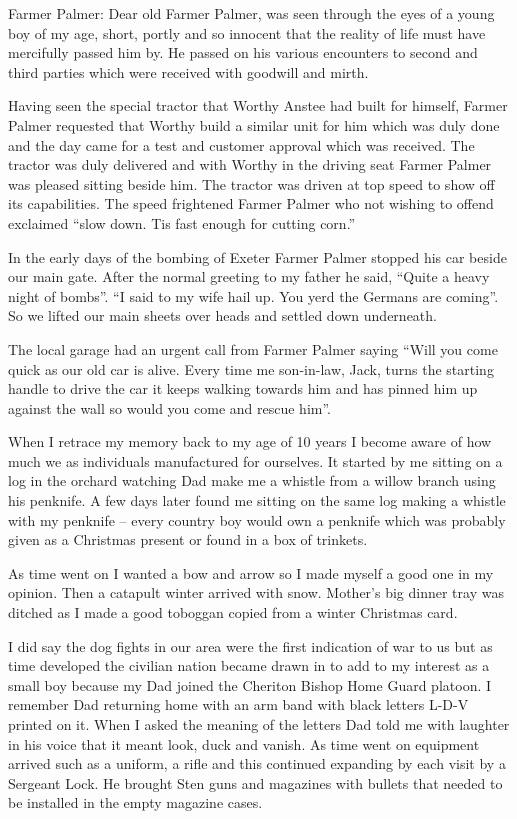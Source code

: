 
Farmer Palmer:  Dear old Farmer Palmer, was seen through the eyes of a young boy
of my age, short,  portly and so innocent that the reality of life must have
mercifully passed him by.  He passed on his various encounters to second and
third parties which were received with goodwill and mirth.

Having seen the special tractor that Worthy Anstee had built for himself, Farmer
Palmer requested that Worthy build a similar unit for him which was duly done
and the day came for a test and customer approval which was received.  The
tractor was duly delivered and with Worthy in the driving seat Farmer Palmer
was pleased sitting beside him.  The tractor was driven at top speed to show
off its capabilities.  The speed frightened Farmer Palmer who not wishing to
offend exclaimed ``slow down. Tis fast enough for cutting corn.''

In the early days of the bombing of Exeter Farmer Palmer stopped his car beside
our main gate.  After the normal greeting to my father he said, ``Quite a heavy
night of bombs''.  ``I said to my wife hail up.  You yerd the Germans are
coming''.  So we lifted our main sheets over heads and settled down
underneath.

The local garage had an urgent call from Farmer Palmer saying ``Will you come
quick as our old car          is alive.   Every time me son-in-law, Jack, turns
the starting handle to drive the car it keeps walking towards him and has
pinned him up against the wall so would you come and rescue him''.

When I retrace my memory back to my age of 10 years I become aware of how much
we as individuals manufactured for ourselves.  It started by me sitting on a
log in the orchard watching Dad make me a whistle from a willow branch using
his penknife.  A few days later found me sitting on the same log making a
whistle with my penknife – every country boy would own a penknife which was
probably given as a Christmas present or found in a box of trinkets.

As time went on I wanted a bow and arrow so I made myself a good one in my
opinion.  Then a catapult winter arrived with snow. Mother's big dinner tray
was ditched as I made a good toboggan copied from a winter Christmas card.

I did say the dog fights in our area were the first indication of war to us but
as time developed the civilian nation became drawn in to add to my interest as
a small boy because my Dad joined the Cheriton Bishop Home Guard platoon.  I
remember Dad returning home with an arm band with black letters L-D-V printed
on it.  When I asked the meaning of the letters Dad told me with laughter in
his voice that it meant look, duck and vanish.  As time went on equipment
arrived such as a uniform, a rifle and this continued expanding by each visit
by a Sergeant Lock.  He brought Sten guns and magazines with bullets that
needed to be installed in the empty magazine cases.

